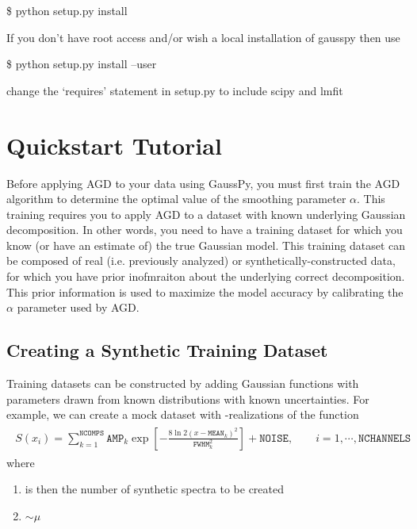 \documentclass[letterpaper,10pt,openany,oneside]{sphinxmanual}
\begin{document}
\$ python setup.py install

If you don't have root access and/or wish a local installation of
gausspy then use

\$ python setup.py install --user

change the `requires' statement in setup.py to include scipy and lmfit


\chapter{Quickstart Tutorial}
\label{tutorial::doc}\label{tutorial:quickstart-tutorial}\label{tutorial:tutorial}
Before applying AGD to your data using GaussPy, you must first train the AGD algorithm to determine the optimal value of the smoothing parameter \(\alpha\). This training requires you to apply AGD to a dataset with known underlying Gaussian decomposition. In other words, you need to have a training dataset for which you know (or have an estimate of) the true Gaussian model. This training dataset can be composed of real (i.e. previously analyzed) or synthetically-constructed data, for which you have prior inofmraiton about the underlying correct decomposition. This prior information is used to maximize the model accuracy by calibrating the \(\alpha\) parameter used by AGD.


\section{Creating a Synthetic Training Dataset}
\label{tutorial:creating-a-synthetic-training-dataset}
Training datasets can be constructed by adding Gaussian functions with
parameters drawn from known distributions with known
uncertainties. For example, we can create a mock dataset with
-realizations of the function
\label{tutorial:equation-spectra}\begin{gather}
\begin{split}S(x_i) = \sum_{k=1}^{\texttt{NCOMPS}} {\texttt{AMP}_k} \exp\left[-\frac{8\ln 2 (x
- \texttt{MEAN}_k)^2}{\texttt{FWHM}_k^2} \right] + \texttt{NOISE},
  \qquad i = 1, \cdots, \texttt{NCHANNELS}\end{split}\label{tutorial-spectra}
\end{gather}
where
\begin{enumerate}
\item {} 
 is then the number of synthetic spectra to be created

\item {} 
 \(\sim \mu\)

\end{enumerate}
\end{document}
